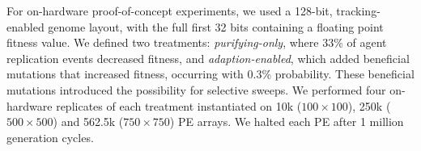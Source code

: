

% 





For on-hardware proof-of-concept experiments, we used a 128-bit, tracking-enabled genome layout, with the full first 32 bits containing a floating point fitness value.
We defined two treatments: \textit{purifying-only}, where 33\% of agent replication events decreased fitness,  and \textit{adaption-enabled}, which added beneficial mutations that increased fitness, occurring with 0.3\% probability.
These beneficial mutations introduced the possibility for selective sweeps.
We performed four on-hardware replicates of each treatment instantiated on 10k ($100\times100$), 250k ($500\times500$) and 562.5k ($750\times750$) PE arrays.
We halted each PE after 1 million generation cycles.

